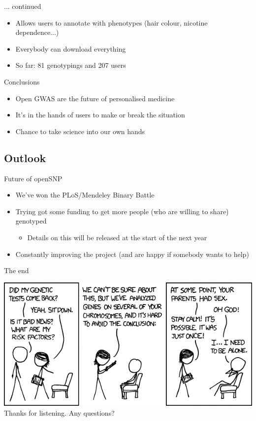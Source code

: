 \documentclass[12pt,a4paper]{beamer}
\begin{document}
\begin{frame}{... continued}
\begin{itemize}
\item Allows users to annotate with phenotypes (hair colour, nicotine dependence...)
\pause \item Everybody can download everything
\pause \item So far: 81 genotypings and 207 users %
\end{itemize}
\end{frame}

\begin{frame}{Conclusions}
\begin{itemize}
\item Open GWAS are the future of personalised medicine
\pause \item It's in the hands of users to make or break the situation
\pause \item Chance to take science into our own hands %
\end{itemize}
\end{frame}

\subsection{Outlook}
\begin{frame}{Future of openSNP}
\begin{itemize}
\item We've won the PLoS/Mendeley Binary Battle
\pause \item Trying got some funding to get more people (who are willing to share) genotyped
\begin{itemize}
\pause \item Details on this will be released at the start of the next year
\end{itemize} 
\pause \item Constantly improving the project (and are happy if somebody wants to help)
\end{itemize}
\end{frame}

\begin{frame}{The end}
\begin{center}
\includegraphics[scale=0.5]{genetic_analysis.png} \\
Thanks for listening. Any questions?
\end{center}
\end{frame}
\end{document}
